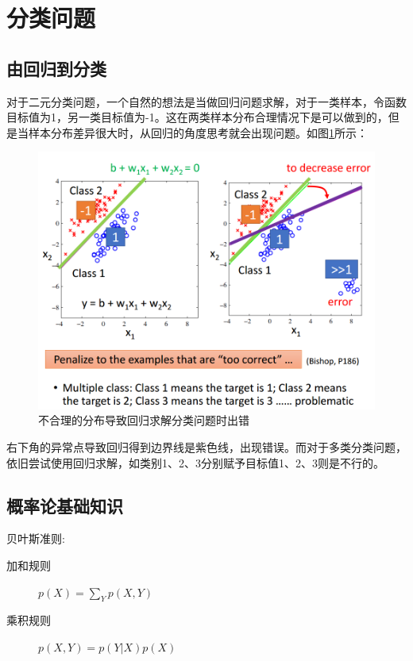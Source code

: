 \section{分类问题}
\subsection{由回归到分类}
对于二元分类问题，一个自然的想法是当做回归问题求解，对于一类样本，令函数目标值为1，另一类目标值为-1。这在两类样本分布合理情况下是可以做到的，但是当样本分布差异很大时，从回归的角度思考就会出现问题。如图\ref{fig:ref_to_classification}所示：
\begin{figure}[ht]
	\centering
	\includegraphics[scale=0.5]{pic/regression_to_classification.png}
	\caption{不合理的分布导致回归求解分类问题时出错}
	\label{fig:ref_to_classification}
\end{figure}
右下角的异常点导致回归得到边界线是紫色线，出现错误。而对于多类分类问题，依旧尝试使用回归求解，如类别1、2、3分别赋予目标值1、2、3则是不行的。

\subsection{概率论基础知识}
\begin{myquotation}{贝叶斯准则:}
\begin{description}
	\item[加和规则] $p(X)=\sum_Y p(X,Y)$
	\item[乘积规则] $p(X,Y)=p(Y|X)p(X)$
\end{description}
\end{myquotation}

